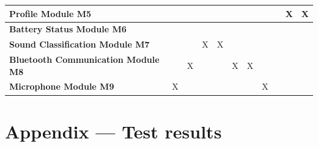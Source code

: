 \documentclass[12pt, titlepage]{article}
\begin{document}
\begin{table}[H]
\begin{tabular}{|p{2.5cm}|llllllllll|}
  \textbf{Profile Module M5}                 & \multicolumn{1}{l|}{}            & \multicolumn{1}{l|}{}            & \multicolumn{1}{l|}{}            & \multicolumn{1}{l|}{}            & \multicolumn{1}{l|}{}            & \multicolumn{1}{l|}{}            & \multicolumn{1}{l|}{}             & \multicolumn{1}{l|}{}             & \multicolumn{1}{l|}{X}            & X            \\ \hline
  \textbf{Battery Status Module M6}          & \multicolumn{1}{l|}{}            & \multicolumn{1}{l|}{}            & \multicolumn{1}{l|}{}            & \multicolumn{1}{l|}{}            & \multicolumn{1}{l|}{}            & \multicolumn{1}{l|}{}            & \multicolumn{1}{l|}{}             & \multicolumn{1}{l|}{}             & \multicolumn{1}{l|}{}             &              \\ \hline
  \textbf{Sound Classification Module M7}    & \multicolumn{1}{l|}{}            & \multicolumn{1}{l|}{}            & \multicolumn{1}{l|}{X}           & \multicolumn{1}{l|}{X}           & \multicolumn{1}{l|}{}            & \multicolumn{1}{l|}{}            & \multicolumn{1}{l|}{}             & \multicolumn{1}{l|}{}             & \multicolumn{1}{l|}{}             &              \\ \hline
  \textbf{Bluetooth Communication Module M8} & \multicolumn{1}{l|}{}            & \multicolumn{1}{l|}{X}           & \multicolumn{1}{l|}{}            & \multicolumn{1}{l|}{}            & \multicolumn{1}{l|}{X}           & \multicolumn{1}{l|}{X}           & \multicolumn{1}{l|}{}             & \multicolumn{1}{l|}{}             & \multicolumn{1}{l|}{}             &              \\ \hline
  \textbf{Microphone Module M9}              & \multicolumn{1}{l|}{X}           & \multicolumn{1}{l|}{}            & \multicolumn{1}{l|}{}            & \multicolumn{1}{l|}{}            & \multicolumn{1}{l|}{}            & \multicolumn{1}{l|}{}            & \multicolumn{1}{l|}{X}            & \multicolumn{1}{l|}{}             & \multicolumn{1}{l|}{}             &              \\ \hline
  \end{tabular}
\end{table}

\newpage{}
\section*{Appendix --- Test results}
\end{document}
